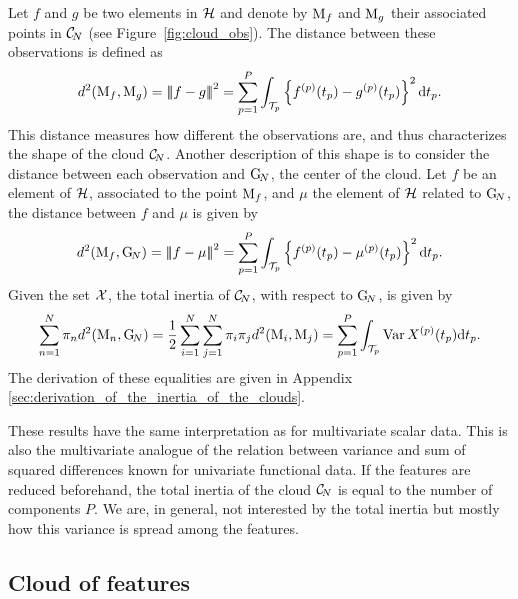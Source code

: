 Let $f$ and $g$ be two elements in $\mathcal{H}$ and denote by $\mathrm{M}_f$ and $\mathrm{M}_g$ their associated points in $\mathcal{C}_{\!N}$ (see Figure~\ref{fig:cloud_obs}). The distance between these observations is defined as
\begin{equation}\label{eq:distance_obs}
    d^2(\mathrm{M}_f, \mathrm{M}_g) = \left|\!\left|\!\left|f - g\right|\!\right|\!\right|^2 = \sum_{p = 1}^P \int_{\mathcal{T}_{p}}\left\{f^{(p)}(t_p) - g^{(p)}(t_p)\right\}^2 {\rm d} t_p.
\end{equation}
This distance measures how different the observations are, and thus characterizes the shape of the cloud $\mathcal{C}_{\!N}$. Another description of this shape is to consider the distance between each observation and $\mathrm{G}_{\!N}$, the center of the cloud. Let $f$ be an element of $\mathcal{H}$, associated to the point $\mathrm{M}_f$, and $\mu$ the element of $\mathcal{H}$ related to $\mathrm{G}_{\!N}$, the distance between $f$ and $\mu$ is given by
\begin{equation}\label{eq:distance_center}
    d^2(\mathrm{M}_f, \mathrm{G}_{\!N}) = \left|\!\left|\!\left|f - \mu\right|\!\right|\!\right|^2 = \sum_{p = 1}^P \int_{\mathcal{T}_{p}}\left\{f^{(p)}(t_p) - \mu^{(p)}(t_p)\right\}^2 {\rm d} t_p.
\end{equation}
Given the set $\mathcal{X}$, the total inertia of $\mathcal{C}_{\!N}$, with respect to $\mathrm{G}_{\!N}$, is given by
\begin{equation}\label{eq:inertia}
    \sum_{n = 1}^N \pi_n d^2(\mathrm{M}_n, \mathrm{G}_{\!N}) = \frac{1}{2}\sum_{i = 1}^N \sum_{j = 1}^N \pi_i \pi_j d^2(\mathrm{M}_i, \mathrm{M}_j) = \sum_{p = 1}^P \int_{\mathcal{T}_{p}}\operatorname{Var}{X^{(p)}(t_p)} {\rm d} t_p.
\end{equation}
The derivation of these equalities are given in Appendix \ref{sec:derivation_of_the_inertia_of_the_clouds}.

\begin{remark}
    These results have the same interpretation as for multivariate scalar data. This is also the multivariate analogue of the relation between variance and sum of squared differences known for univariate functional data. If the features are reduced beforehand, the total inertia of the cloud $\mathcal{C}_{\!N}$ is equal to the number of components $P$. We are, in general, not interested by the total inertia but mostly how this variance is spread among the features.
\end{remark}


\subsection{Cloud of features} %
\label{sub:cloud_of_features}

